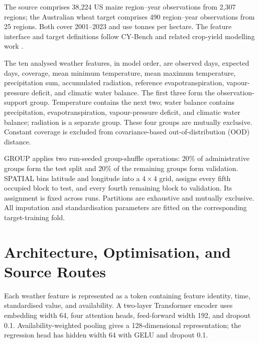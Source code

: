\documentclass[runningheads]{venue/lncs/llncs}
\begin{document}
The source comprises 38,224 US maize region--year observations from 2,307 regions; the Australian wheat target comprises 490 region--year observations from 25 regions. Both cover 2001--2023 and use tonnes per hectare. The feature interface and target definitions follow CY-Bench and related crop-yield modelling work \cite{Kallenberg2026CYBench,Khaki2019DNNYield}.

The ten analysed weather features, in model order, are observed days, expected days, coverage, mean minimum temperature, mean maximum temperature, precipitation sum, accumulated radiation, reference evapotranspiration, vapour-pressure deficit, and climatic water balance. The first three form the observation-support group. Temperature contains the next two; water balance contains precipitation, evapotranspiration, vapour-pressure deficit, and climatic water balance; radiation is a separate group. These four groups are mutually exclusive. Constant coverage is excluded from covariance-based out-of-distribution (OOD) distance.

GROUP applies two run-seeded group-shuffle operations: 20\% of administrative groups form the test split and 20\% of the remaining groups form validation. SPATIAL bins latitude and longitude into a $4\times4$ grid, assigns every fifth occupied block to test, and every fourth remaining block to validation. Its assignment is fixed across runs. Partitions are exhaustive and mutually exclusive. All imputation and standardisation parameters are fitted on the corresponding target-training fold.

\section{Architecture, Optimisation, and Source Routes}

Each weather feature is represented as a token containing feature identity, time, standardised value, and availability. A two-layer Transformer encoder \cite{Vaswani2017Transformer} uses embedding width 64, four attention heads, feed-forward width 192, and dropout 0.1. Availability-weighted pooling gives a 128-dimensional representation; the regression head has hidden width 64 with GELU and dropout 0.1.
\end{document}
